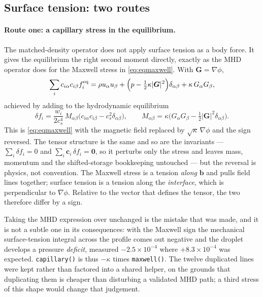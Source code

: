 \documentclass[11pt,a4paper]{article}
\newcommand{\code}[1]{\texttt{\small #1}}
\newcommand{\cs}{c_s}
\newcommand{\ci}{\bm{c}_i}
\newcommand{\bb}{\bm{b}}
\newcommand{\e}[1]{\times 10^{#1}}
\begin{document}
\subsection{Surface tension: two routes}
\label{sec:surftens}

\paragraph{Route one: a capillary stress in the equilibrium.} The matched-density
operator does not apply surface tension as a body force. It gives the equilibrium
the right second moment directly, exactly as the MHD operator does for the
Maxwell stress in \eqref{eq:eqmaxwell}. With $\bm{G}=\nabla\phi$,
\begin{equation}
  \sum_i c_{i\alpha}c_{i\beta} f_i^{\rm eq}
    = \rho u_\alpha u_\beta
      + \Big(p - \tfrac12\kappa|\bm{G}|^2\Big)\delta_{\alpha\beta}
      + \kappa\,G_\alpha G_\beta ,
\end{equation}
achieved by adding to the hydrodynamic equilibrium
\begin{equation}
  \delta f_i = \frac{w_i}{2\cs^4}\,M_{\alpha\beta}
    \big(c_{i\alpha}c_{i\beta}-\cs^2\delta_{\alpha\beta}\big),
  \qquad
  M_{\alpha\beta} = \kappa\Big(G_\alpha G_\beta
    - \tfrac12|\bm{G}|^2\delta_{\alpha\beta}\Big).
  \label{eq:capstress}
\end{equation}
This is \eqref{eq:eqmaxwell} with the magnetic field replaced by
$\sqrt{\kappa}\,\nabla\phi$ and the sign reversed. The tensor structure is the
same and so are the invariants --- $\sum_i\delta f_i = 0$ and
$\sum_i\ci\,\delta f_i = \bm{0}$, so it perturbs only the stress and leaves mass,
momentum and the shifted-storage bookkeeping untouched --- but the reversal is
physics, not convention. The Maxwell stress is a tension \emph{along} $\bb$ and
pulls field lines together; surface tension is a tension along the
\emph{interface}, which is perpendicular to $\nabla\phi$. Relative to the vector
that defines the tensor, the two therefore differ by a sign.

Taking the MHD expression over unchanged is the mistake that was made, and it is
not a subtle one in its consequences: with the Maxwell sign the mechanical
surface-tension integral across the profile comes out negative and the droplet
develops a pressure \emph{deficit}, measured $-2.5\e{-4}$ where $+8.3\e{-4}$ was
expected. \code{capillary()} is thus $-\kappa$ times \code{maxwell()}. The twelve
duplicated lines were kept rather than factored into a shared helper, on the
grounds that duplicating them is cheaper than disturbing a validated MHD path; a
third stress of this shape would change that judgement.
\end{document}
